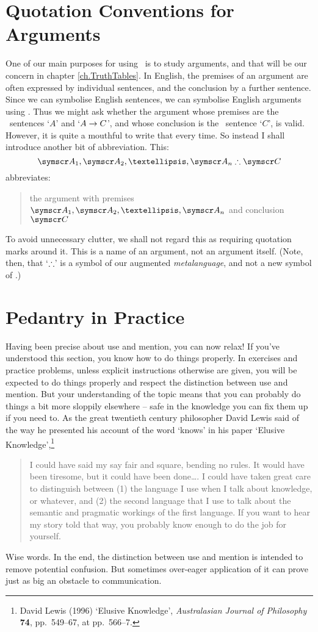 \section{Quotation Conventions for Arguments}
One of our main purposes for using \TFL\ is to study arguments, and that will be our concern in chapter \ref{ch.TruthTables}. In English, the premises of an argument are often expressed by individual sentences, and the conclusion by a further sentence. Since we can symbolise English sentences, we can symbolise English arguments using \TFL. Thus we might ask whether the argument whose premises are the \TFL\ sentences `$A$' and `$A \rightarrow C$', and whose conclusion is the \TFL\ sentence `$C$', is valid. However, it is quite a mouthful to write that every time. So instead I shall introduce another bit of abbreviation. This:
	$$\meta{A}_1, \meta{A}_2, …, \meta{A}_n \ttherefore \meta{C}$$
abbreviates:
	\begin{quote}
		the argument with premises $\meta{A}_1, \meta{A}_2, …, \meta{A}_n$ and conclusion $\meta{C}$
	\end{quote}
To avoid unnecessary clutter, we shall not regard this as requiring quotation marks around it. This is a name of an argument, not an argument itself. (Note, then, that `$\mathrel{\therefore}$' is a symbol of our augmented \emph{metalanguage}, and not a new symbol of \TFL.)

\section{Pedantry in Practice}

Having been precise about use and mention, you can now relax! If you've understood this section, you know how to do things properly. In exercises and practice problems, unless explicit instructions otherwise are given, you will be expected to do things properly and respect the distinction between use and mention. But your understanding of the topic means that you can probably do things a bit more sloppily elsewhere – safe in the knowledge you can fix them up if you need to. As the great twentieth century philosopher David Lewis said of the way he presented his account of the word ‘knows’ in his paper `Elusive Knowledge',\footnote{David Lewis (1996) `Elusive Knowledge', \emph{Australasian Journal of Philosophy} \textbf{74}, pp.\ 549–67, at pp.\ 566–7.} \begin{quote}
	I could have said my say fair and square, bending no rules.  It would have been tiresome, but it could have been done…. I could have taken great care to distinguish between (1) the language I use when I talk about knowledge, or whatever, and (2) the second language that I use to talk about the semantic and pragmatic workings of the first language.  If you want to hear my story told that way, you probably know enough to do the job for yourself.
\end{quote} Wise words. In the end, the distinction between use and mention is intended to remove potential confusion. But sometimes over-eager application of it can prove just as big an obstacle to communication.


